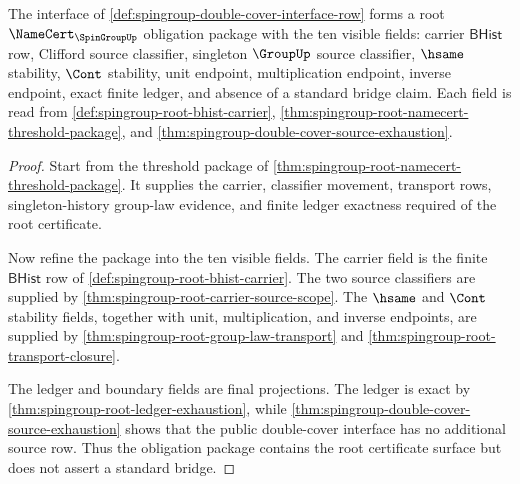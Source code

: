 \begin{theorem}
\label{thm:spingroup-namecert-root-obligation-package}
The interface of \autoref{def:spingroup-double-cover-interface-row} forms a root $\NameCert_{\SpinGroupUp}$ obligation package with the ten visible fields: carrier $\mathsf{BHist}$ row, Clifford source classifier, singleton $\GroupUp$ source classifier, $\hsame$ stability, $\Cont$ stability, unit endpoint, multiplication endpoint, inverse endpoint, exact finite ledger, and absence of a standard bridge claim. Each field is read from \autoref{def:spingroup-root-bhist-carrier}, \autoref{thm:spingroup-root-namecert-threshold-package}, and \autoref{thm:spingroup-double-cover-source-exhaustion}.
\end{theorem}
\begin{proof}
Start from the threshold package of \autoref{thm:spingroup-root-namecert-threshold-package}. It supplies the carrier, classifier movement, transport rows, singleton-history group-law evidence, and finite ledger exactness required of the root certificate.

Now refine the package into the ten visible fields. The carrier field is the finite $\mathsf{BHist}$ row of \autoref{def:spingroup-root-bhist-carrier}. The two source classifiers are supplied by \autoref{thm:spingroup-root-carrier-source-scope}. The $\hsame$ and $\Cont$ stability fields, together with unit, multiplication, and inverse endpoints, are supplied by \autoref{thm:spingroup-root-group-law-transport} and \autoref{thm:spingroup-root-transport-closure}.

The ledger and boundary fields are final projections. The ledger is exact by \autoref{thm:spingroup-root-ledger-exhaustion}, while \autoref{thm:spingroup-double-cover-source-exhaustion} shows that the public double-cover interface has no additional source row. Thus the obligation package contains the root certificate surface but does not assert a standard bridge.
\end{proof}

